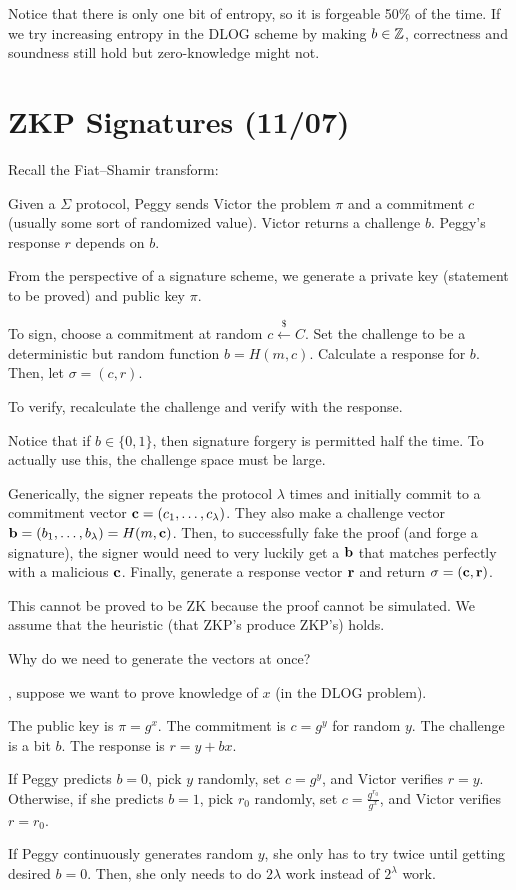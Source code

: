 \documentclass[notes]{agony}
\newcommand{\xgets}{\xleftarrow}
\begin{document}
Notice that there is only one bit of entropy, so it is forgeable 50\% of the time.
If we try increasing entropy in the DLOG scheme by making $b \in \mathbb{Z}$,
correctness and soundness still hold but zero-knowledge might not.

\section{ZKP Signatures (11/07)}

Recall the Fiat--Shamir transform:

Given a $\Sigma$ protocol,
Peggy sends Victor the problem $\pi$
and a commitment $c$ (usually some sort of randomized value).
Victor returns a challenge $b$.
Peggy's response $r$ depends on $b$.

From the perspective of a signature scheme,
we generate a private key (statement to be proved)
and public key $\pi$.

To sign, choose a commitment at random $c \xgets{\$} C$.
Set the challenge to be a deterministic but random function $b = H(m, c)$.
Calculate a response for $b$.
Then, let $\sigma = (c, r)$.

To verify, recalculate the challenge and verify with the response.

Notice that if $b \in \{0,1\}$, then signature forgery is permitted half the time.
To actually use this, the challenge space must be large.

Generically, the signer repeats the protocol $\lambda$ times
and initially commit to a commitment vector $\vb c = (c_1,\dotsc,c_\lambda)$.
They also make a challenge vector $\vb b = (b_1,\dotsc,b_\lambda) = H(m,\vb c)$.
Then, to successfully fake the proof (and forge a signature),
the signer would need to very luckily get a $\vb b$
that matches perfectly with a malicious $\vb c$.
Finally, generate a response vector $\vb r$ and return $\sigma = (\vb c, \vb r)$.

This cannot be proved to be ZK because the proof cannot be simulated.
We assume that the heuristic (that ZKP's produce ZKP's) holds.

\begin{example}
  Why do we need to generate the vectors at once?

  \WLOG, suppose we want to prove knowledge of $x$ (in the DLOG problem).

  The public key is $\pi = g^x$.
  The commitment is $c = g^y$ for random $y$.
  The challenge is a bit $b$.
  The response is $r = y + bx$.

  If Peggy predicts $b = 0$,
  pick $y$ randomly, set $c = g^y$,
  and Victor verifies $r = y$.
  Otherwise, if she predicts $b = 1$,
  pick $r_0$ randomly, set $c = \frac{g^{r_0}}{g^x}$,
  and Victor verifies $r = r_0$.

  If Peggy continuously generates random $y$,
  she only has to try twice until getting desired $b=0$.
  Then, she only needs to do $2\lambda$ work instead of $2^\lambda$ work.
\end{example}
\end{document}
